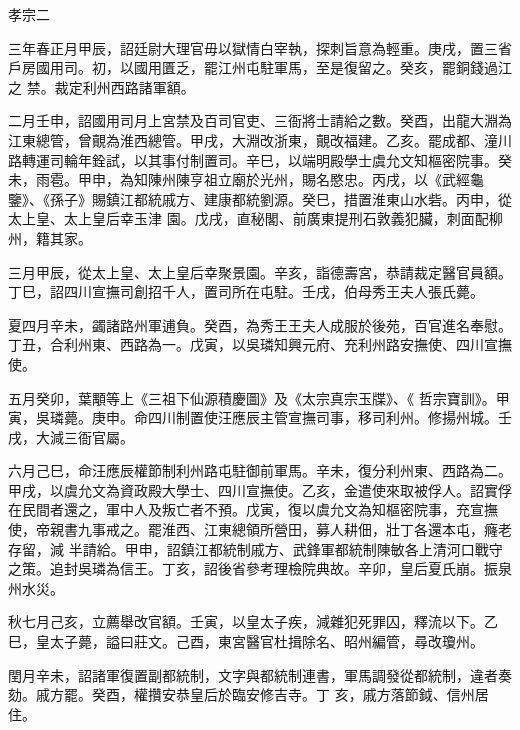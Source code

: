 
\begin{pinyinscope}

 孝宗二



 三年春正月甲辰，詔廷尉大理官毋以獄情白宰執，探刺旨意為輕重。庚戌，置三省戶房國用司。初，以國用匱乏，罷江州屯駐軍馬，至是復留之。癸亥，罷銅錢過江之
 禁。裁定利州西路諸軍額。



 二月壬申，詔國用司月上宮禁及百司官吏、三衙將士請給之數。癸酉，出龍大淵為江東總管，曾覿為淮西總管。甲戌，大淵改浙東，覿改福建。乙亥。罷成都、潼川路轉運司輪年銓試，以其事付制置司。辛巳，以端明殿學士虞允文知樞密院事。癸未，雨雹。甲申，為知陳州陳亨祖立廟於光州，賜名愍忠。丙戌，以《武經龜鑒》、《孫子》賜鎮江都統戚方、建康都統劉源。癸巳，措置淮東山水砦。丙申，從太上皇、太上皇后幸玉津
 園。戊戌，直秘閣、前廣東提刑石敦義犯臟，刺面配柳州，籍其家。



 三月甲辰，從太上皇、太上皇后幸聚景園。辛亥，詣德壽宮，恭請裁定醫官員額。丁巳，詔四川宣撫司創招千人，置司所在屯駐。壬戌，伯母秀王夫人張氏薨。



 夏四月辛未，蠲諸路州軍逋負。癸酉，為秀王王夫人成服於後苑，百官進名奉慰。丁丑，合利州東、西路為一。戊寅，以吳璘知興元府、充利州路安撫使、四川宣撫使。



 五月癸卯，葉顒等上《三祖下仙源積慶圖》及《太宗真宗玉牒》、《
 哲宗寶訓》。甲寅，吳璘薨。庚申。命四川制置使汪應辰主管宣撫司事，移司利州。修揚州城。壬戌，大減三衙官屬。



 六月己巳，命汪應辰權節制利州路屯駐御前軍馬。辛未，復分利州東、西路為二。甲戌，以虞允文為資政殿大學士、四川宣撫使。乙亥，金遣使來取被俘人。詔實俘在民間者還之，軍中人及叛亡者不預。戊寅，復以虞允文為知樞密院事，充宣撫使，帝親書九事戒之。罷淮西、江東總領所營田，募人耕佃，壯丁各還本屯，癃老存留，減
 半請給。甲申，詔鎮江都統制戚方、武鋒軍都統制陳敏各上清河口戰守之策。追封吳璘為信王。丁亥，詔後省參考理檢院典故。辛卯，皇后夏氏崩。振泉州水災。



 秋七月己亥，立薦舉改官額。壬寅，以皇太子疾，減雜犯死罪囚，釋流以下。乙巳，皇太子薨，謚曰莊文。己酉，東宮醫官杜揖除名、昭州編管，尋改瓊州。



 閏月辛未，詔諸軍復置副都統制，文字與都統制連書，軍馬調發從都統制，違者奏劾。戚方罷。癸酉，權攢安恭皇后於臨安修吉寺。丁
 亥，戚方落節鉞、信州居住。




\end{pinyinscope}
